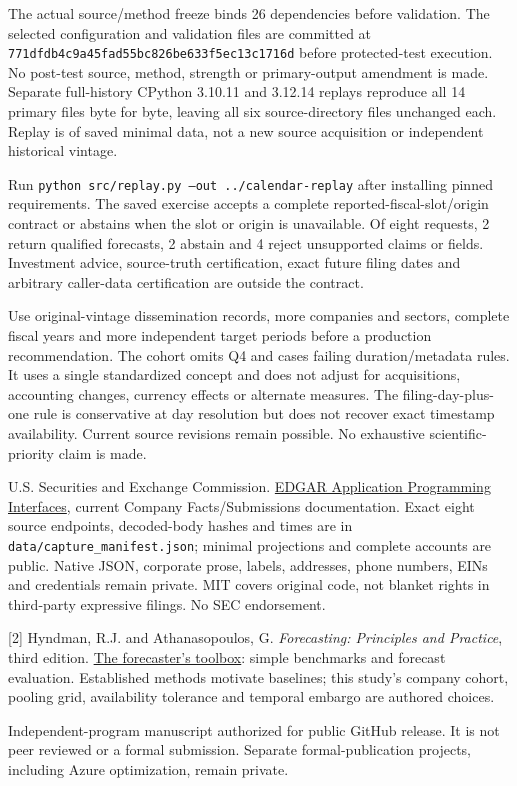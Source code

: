 \documentclass[11pt,letterpaper]{article}
\newcommand{\heading}[1]{\vspace{4pt}{\large\bfseries #1}\par}
\newcommand{\BoundCJ}{2}
\newcommand{\BoundCK}{2}
\newcommand{\BoundCL}{4}
\begin{document}
The actual source/method freeze binds 26 dependencies before validation. The selected configuration and validation files are committed at \texttt{771dfdb4c9a45fad55bc826be633f5ec13c1716d} before protected-test execution. No post-test source, method, strength or primary-output amendment is made. Separate full-history CPython 3.10.11 and 3.12.14 replays reproduce all 14 primary files byte for byte, leaving all six source-directory files unchanged each. Replay is of saved minimal data, not a new source acquisition or independent historical vintage.

\heading{Implementation exercise}
Run \texttt{python src/replay.py --out ../calendar-replay} after installing pinned requirements. The saved exercise accepts a complete reported-fiscal-slot/origin contract or abstains when the slot or origin is unavailable. Of eight requests, \BoundCJ{} return qualified forecasts, \BoundCK{} abstain and \BoundCL{} reject unsupported claims or fields. Investment advice, source-truth certification, exact future filing dates and arbitrary caller-data certification are outside the contract.

\heading{What further evidence would change the recommendation}
Use original-vintage dissemination records, more companies and sectors, complete fiscal years and more independent target periods before a production recommendation. The cohort omits Q4 and cases failing duration/metadata rules. It uses a single standardized concept and does not adjust for acquisitions, accounting changes, currency effects or alternate measures. The filing-day-plus-one rule is conservative at day resolution but does not recover exact timestamp availability. Current source revisions remain possible. No exhaustive scientific-priority claim is made.

\heading{Sources and publication boundary}
[1] U.S. Securities and Exchange Commission. \href{https://www.sec.gov/search-filings/edgar-application-programming-interfaces}{EDGAR Application Programming Interfaces}, current Company Facts/Submissions documentation. Exact eight source endpoints, decoded-body hashes and times are in \texttt{data/capture\_manifest.json}; minimal projections and complete accounts are public. Native JSON, corporate prose, labels, addresses, phone numbers, EINs and credentials remain private. MIT covers original code, not blanket rights in third-party expressive filings. No SEC endorsement.

[2] Hyndman, R.J. and Athanasopoulos, G. \textit{Forecasting: Principles and Practice}, third edition. \href{https://otexts.com/fpp3/toolbox.html}{The forecaster's toolbox}: simple benchmarks and forecast evaluation. Established methods motivate baselines; this study's company cohort, pooling grid, availability tolerance and temporal embargo are authored choices.

Independent-program manuscript authorized for public GitHub release. It is not peer reviewed or a formal submission. Separate formal-publication projects, including Azure optimization, remain private.
\end{document}

